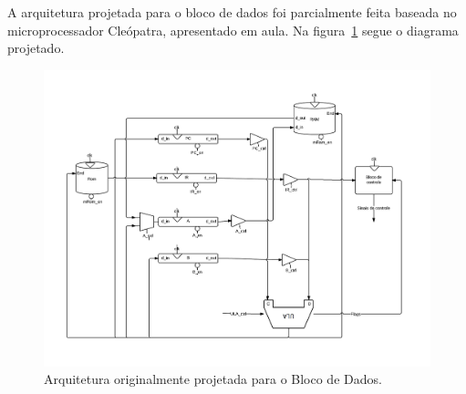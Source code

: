 \documentclass[../main.tex]{subfiles}
\begin{document}
	A arquitetura projetada para o bloco de dados foi parcialmente feita baseada no microprocessador Cleópatra, apresentado em aula. Na figura~\ref{fig:arq_bloco_dados} segue o
	diagrama projetado.
	
	\begin{figure}[H]
		\centering
		\includegraphics[width=\textwidth]{img/bloco_dados}
		\caption{Arquitetura originalmente projetada para o Bloco de Dados.}
		\label{fig:arq_bloco_dados}
	\end{figure}
	
\end{document}
